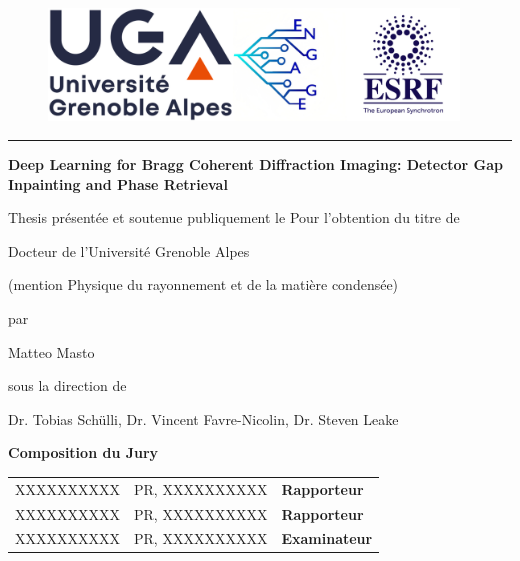\documentclass[12pt]{book}
\begin{document}
\begin{titlepage}
	
\begin{figure}
     \center
    \includegraphics[height=3cm]{figures/logos/full_logo.png}
\end{figure}
\hrule
		
\vfill

\begin{center}	
	{
        \Large \bfseries Deep Learning for Bragg Coherent Diffraction Imaging: Detector Gap Inpainting and Phase Retrieval
    }
\end{center}	
		
\vfill
\begin{center}	
	{\Huge  Thesis}
	\vfill
	présentée et soutenue publiquement le %
	\vfill
	Pour l'obtention du titre de 
	\vfill
	
	{\Large Docteur de l'Université Grenoble Alpes}
	
	(mention Physique du rayonnement et de la matière condensée)
	
	\vfill
	par 
	
	Matteo Masto
	
\vfill
sous la direction de 

Dr. Tobias Sch\"ulli, Dr. Vincent Favre-Nicolin, Dr. Steven Leake
	
\end{center}


\vspace{1cm}
			
{\bfseries Composition du Jury}		
\begin{center}
	\begin{tabular}{lll}
		
		XXXXXXXXXX &  PR, XXXXXXXXXX & \textbf{Rapporteur}\\
		
		XXXXXXXXXX  &  PR, XXXXXXXXXX & \textbf{Rapporteur} \\
		
		XXXXXXXXXX & PR, XXXXXXXXXX & \textbf{Examinateur} \\
		

\end{tabular}
\end{center}
\end{titlepage}
\end{document}
